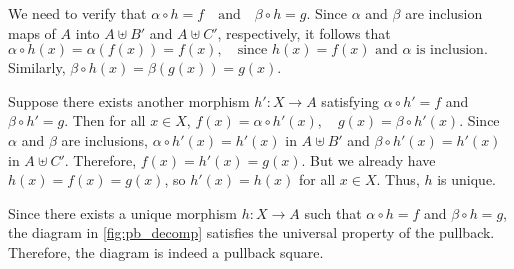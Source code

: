 We need to verify that
$
\alpha \circ h = f \quad \text{and} \quad \beta \circ h = g.
$
Since \( \alpha \) and \( \beta \) are inclusion maps of \( A \) into \( A \uplus B' \) and \( A \uplus C' \), respectively, it follows that
$
\alpha \circ h(x) = \alpha(f(x)) = f(x), \quad \text{since } h(x) = f(x) \text{ and } \alpha \text{ is inclusion}.
$
Similarly,
$
\beta \circ h(x) = \beta(g(x)) = g(x).
$

Suppose there exists another morphism \( h': X \to A \) satisfying \( \alpha \circ h' = f \) and \( \beta \circ h' = g \). Then for all \( x \in X \),
$
f(x) = \alpha \circ h'(x), \quad g(x) = \beta \circ h'(x).
$
Since \( \alpha \) and \( \beta \) are inclusions, \( \alpha \circ h'(x) = h'(x) \) in \( A \uplus B' \) and \( \beta \circ h'(x) = h'(x) \) in \( A \uplus C' \). Therefore,
$
f(x) = h'(x) = g(x).
$
But we already have \( h(x) = f(x) = g(x) \), so \( h'(x) = h(x) \) for all \( x \in X \). Thus, \( h \) is unique.

Since there exists a unique morphism \( h: X \to A \) such that \( \alpha \circ h = f \) and \( \beta \circ h = g \), the diagram in \autoref{fig:pb_decomp} satisfies the universal property of the pullback. Therefore, the diagram is indeed a pullback square.